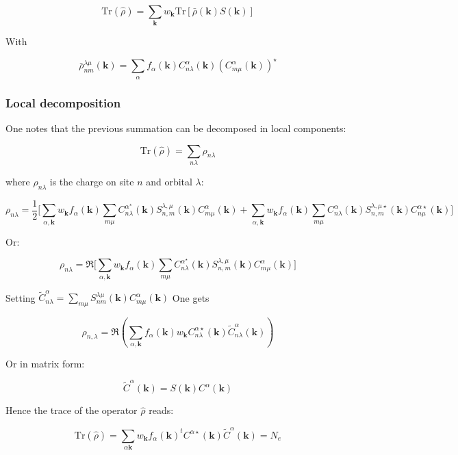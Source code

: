 \documentclass{article}
\newcommand{\op}[1]{\hat{#1}}
\begin{document}
\[ \text{Tr}(\op{\rho})=\sum_{\mathbf{k}}w_{\mathbf{k}} \text{Tr}\left[\bar{\rho}(\mathbf{k})S(\mathbf{k})\right] \]

\noindent
With

\[ \bar{\rho}_{n m}^{\lambda \mu}(\mathbf{k})=  \sum_{\alpha} f_{\alpha}(\mathbf{k})
C_{n \lambda}^{\alpha}(\mathbf{k})(C_{m \mu}^{\alpha}(\mathbf{k}))^{\star}    \]

\subsubsection{Local decomposition}

\noindent One notes that the previous summation can be decomposed in local components:

\[ \displaystyle \mbox{Tr}(\op{\rho})=\sum_{n \lambda} \rho_{n
\lambda} \]

\noindent
where $\rho_{n \lambda}$ is the charge on site $n$ and orbital $\lambda$:

\[\rho_{n \lambda}=\frac{1}{2}\Bigg[\sum_{\alpha,\mathbf{k}} w_{\mathbf{k}}
f_{\alpha}(\mathbf{k}) \sum_{m \mu} C_{n
\lambda}^{\alpha ^{\star}}(\mathbf{k})S_{n,m}^{\lambda,\mu}(\mathbf{k})C_{m \mu}^{\alpha}(\mathbf{k}) + \sum_{\alpha,\mathbf{k}}
w_{\mathbf{k}}f_{\alpha}(\mathbf{k}) \sum_{m
\mu} C_{n \lambda}^{\alpha}(\mathbf{k})S_{n,m}^{\lambda,\mu
\star}(\mathbf{k})C_{n \mu}^{\alpha \star}(\mathbf{k}) \Bigg]\]

\noindent Or:

\[\rho_{n \lambda}=\Re \Bigg[\sum_{\alpha,\mathbf{k}}
w_{\mathbf{k}} f_{\alpha}(\mathbf{k}) \sum_{m
\mu} C_{n \lambda}^{\alpha
^{\star}}(\mathbf{k})S_{n,m}^{\lambda,\mu}(\mathbf{k})C_{m
\mu}^{\alpha}(\mathbf{k})\Bigg]\]


\noindent
Setting $\displaystyle \widetilde{C}_{n\lambda}^{\alpha}=\sum_{m \mu} 
S_{nm}^{\lambda \mu}(\mathbf{k}) C_{m \mu}^{\alpha}(\mathbf{k})$
\noindent
One gets

\[\displaystyle \rho_{n,\lambda}= \Re \left(
\sum_{\alpha,\mathbf{k}} f_{\alpha}(\mathbf{k})w_{\mathbf{k}}
C_{n \lambda}^{\alpha \star}(\mathbf{k})\widetilde{C}_{n\lambda}^{\alpha }(\mathbf{k})
 \right)\]

\noindent
Or in matrix form:

\[ 
\widetilde{C}^{\alpha}(\mathbf{k})=S(\mathbf{k})C^{\alpha}(\mathbf{k}) 
\]

\noindent
Hence the trace of the operator $\op{\rho}$ reads:

\[ \mbox{Tr} (\op{\rho })= 
\sum_{\alpha \mathbf{k}} w_{\mathbf{k}}
f_{\alpha}(\mathbf{k}) ^tC^{\alpha
\star}(\mathbf{k})\widetilde{C}^{\alpha}(\mathbf{k}) =N_e\]
\end{document}

